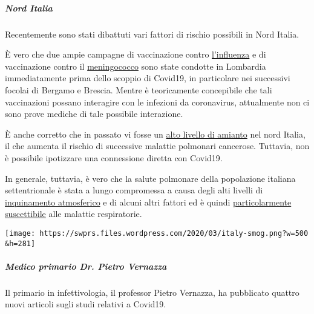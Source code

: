 \hypertarget{nord-italia}{%
\subparagraph{\texorpdfstring{\textbf{Nord
Italia}}{Nord Italia}}\label{nord-italia}}

Recentemente sono stati dibattuti vari fattori di rischio possibili in
Nord Italia.

È vero che due ampie campagne di vaccinazione contro
\href{https://www.bergamonews.it/2019/10/21/vaccinazione-antinfluenzale-a-bergamo-ordinate-185-000-dosi-di-vaccino/332164/}{l'influenza}
e di vaccinazione contro il
\href{https://www.bsnews.it/2020/01/18/meningite-vaccinate-34mila-persone-tra-brescia-e-bergamo/}{meningococco}
sono state condotte in Lombardia immediatamente prima dello scoppio di
Covid19, in particolare nei successivi focolai di Bergamo e Brescia.
Mentre è teoricamente concepibile che tali vaccinazioni possano
interagire con le infezioni da coronavirus, attualmente non ci sono
prove mediche di tale possibile interazione.

È anche corretto che in passato vi fosse un
\href{https://www.spiegel.de/panorama/justiz/asbest-prozess-in-italien-nun-sind-alle-krank-a-666421.html}{alto
livello di amianto} nel nord Italia, il che aumenta il rischio di
successive malattie polmonari cancerose. Tuttavia, non è possibile
ipotizzare una connessione diretta con Covid19.

In generale, tuttavia, è vero che la salute polmonare della popolazione
italiana settentrionale è stata a lungo compromessa a causa degli alti
livelli di
\href{https://www.heise.de/tp/features/Feinstaubpartikel-als-Viren-Vehikel-4687454.html}{inquinamento
atmosferico} e di alcuni altri fattori ed è quindi
\href{https://www.srf.ch/news/international/massive-schadstoffbelastung-nirgendwo-erkranken-so-viele-wegen-smog-wie-in-norditalien}{particolarmente
suscettibile} alle malattie respiratorie.

\texttt{[image: https://swprs.files.wordpress.com/2020/03/italy-smog.png?w=500\\\&h=281]}

\hypertarget{medico-primario-dr-pietro-vernazza}{%
\subparagraph{\texorpdfstring{\textbf{Medico primario Dr. Pietro
Vernazza}}{Medico primario Dr. Pietro Vernazza}}\label{medico-primario-dr-pietro-vernazza}}

Il primario in infettivologia, il professor Pietro Vernazza, ha
pubblicato quattro nuovi articoli sugli studi relativi a Covid19.

